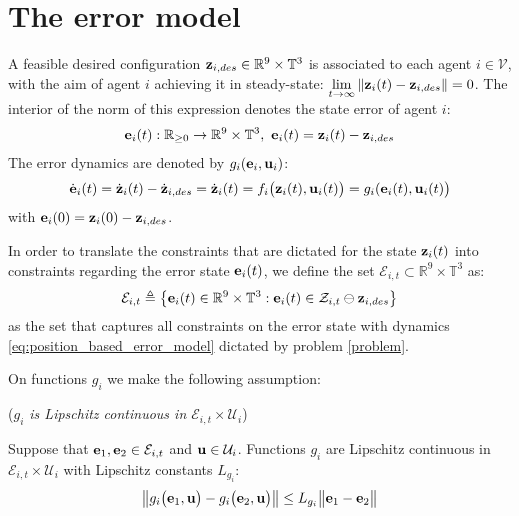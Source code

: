 \section{The error model}

A feasible desired configuration
$\bm{\mathbf{z}}_{i,des} \in \mathbb{R}^9 \times \mathbb{T}^3$
is associated to each agent $i \in \mathcal{V}$, with the aim of agent $i$
achieving it in steady-state:
$\lim\limits_{t \to \infty} \|\bm{\mathbf{z}}_i(t) - \bm{\mathbf{z}}_{i,des}\| = 0$. The
interior of the norm of this expression denotes the state error of agent $i$:
\begin{align}
  \bm{\mathbf{e}}_i(t) : \mathbb{R}_{\geq 0} \to \mathbb{R}^9 \times \mathbb{T}^3,\
  \bm{\mathbf{e}}_i(t) = \bm{\mathbf{z}}_i(t) - \bm{\mathbf{z}}_{i,des}
\end{align}
The error dynamics are denoted by $g_i(\bm{\mathbf{e}}_i, \bm{\mathbf{u}}_i)$:
\begin{align}
  \dot{\bm{\mathbf{e}}}_i(t) = \dot{\bm{\mathbf{z}}}_i(t) - \dot{\bm{\mathbf{z}}}_{i,des} =
  \dot{\bm{\mathbf{z}}}_i(t) = f_i\big(\bm{\mathbf{z}}_i(t), \bm{\mathbf{u}}_i(t)\big) = g_i(\bm{\mathbf{e}}_i(t), \bm{\mathbf{u}}_i(t)\big)
  \label{eq:position_based_error_model}
\end{align}
with $\bm{\mathbf{e}}_i(0) = \bm{\mathbf{z}}_i(0) - \bm{\mathbf{z}}_{i,des}$.

In order to translate
the constraints that are dictated for the state $\bm{\mathbf{z}}_i(t)$ into constraints
regarding the error state $\bm{\mathbf{e}}_i(t)$, we define the set
$\mathcal{E}_{i,t} \subset \mathbb{R}^9 \times \mathbb{T}^3$ as:
$$\mathcal{E}_{i,t} \triangleq \big\{\bm{\mathbf{e}}_i(t) \in \mathbb{R}^9 \times \mathbb{T}^3 :
\bm{\mathbf{e}}_i(t) \in \mathcal{Z}_{i,t} \ominus \bm{\mathbf{z}}_{i,des}\big\}$$
as the set that captures all constraints on the error state with dynamics
\eqref{eq:position_based_error_model} dictated by problem \eqref{problem}.

On functions $g_i$ we make the following assumption:
\begin{bw_box}
  \begin{assumption} (\textit{$g_i$ is Lipschitz continuous in $\mathcal{E}_{i,t} \times \mathcal{U}_i$})
  \label{ass:g_i_Lipschitz}

  Suppose that $\bm{\mathbf{e}}_1, \bm{\mathbf{e}}_2 \in \mathcal{E}_{i,t}$ and
  $\bm{\mathbf{u}} \in \mathcal{U}_i$. Functions $g_i$ are Lipschitz continuous in
  $\mathcal{E}_{i,t} \times \mathcal{U}_i$ with Lipschitz constants $L_{g_i}$:
  \begin{align}
    \big\|g_i\big(\bm{\mathbf{e}}_1, \bm{\mathbf{u}} \big) - g_i\big(\bm{\mathbf{e}}_2, \bm{\mathbf{u}} \big)\big\|
      \leq L_{g_i} \big\|\bm{\mathbf{e}}_1 - \bm{\mathbf{e}}_2\big\|
  \end{align}

\end{assumption}
\end{bw_box}

